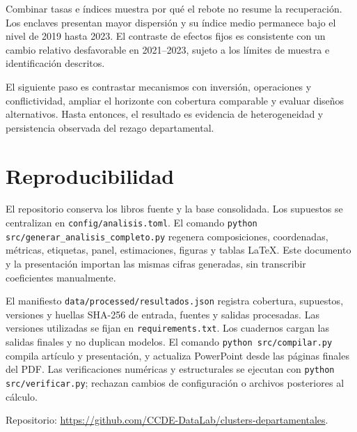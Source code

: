 Combinar tasas e índices muestra por qué el rebote no resume la recuperación. Los enclaves presentan mayor dispersión y su índice medio permanece bajo el nivel de 2019 hasta 2023. El contraste de efectos fijos es consistente con un cambio relativo desfavorable en 2021--2023, sujeto a los límites de muestra e identificación descritos.

El siguiente paso es contrastar mecanismos con inversión, operaciones y conflictividad, ampliar el horizonte con cobertura comparable y evaluar diseños alternativos. Hasta entonces, el resultado es evidencia de heterogeneidad y persistencia observada del rezago departamental.

\section{Reproducibilidad}
El repositorio conserva los libros fuente y la base consolidada. Los supuestos se centralizan en \texttt{config/analisis.toml}. El comando \texttt{python src/generar\_analisis\_completo.py} regenera composiciones, coordenadas, métricas, etiquetas, panel, estimaciones, figuras y tablas LaTeX. Este documento y la presentación importan las mismas cifras generadas, sin transcribir coeficientes manualmente.

El manifiesto \texttt{data/processed/resultados.json} registra cobertura, supuestos, versiones y huellas SHA-256 de entrada, fuentes y salidas procesadas. Las versiones utilizadas se fijan en \texttt{requirements.txt}. Los cuadernos cargan las salidas finales y no duplican modelos. El comando \texttt{python src/compilar.py} compila artículo y presentación, y actualiza PowerPoint desde las páginas finales del PDF. Las verificaciones numéricas y estructurales se ejecutan con \texttt{python src/verificar.py}; rechazan cambios de configuración o archivos posteriores al cálculo.

\noindent Repositorio: \url{https://github.com/CCDE-DataLab/clusters-departamentales}.
\FloatBarrier
